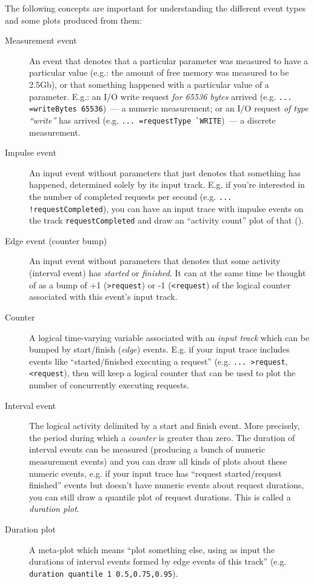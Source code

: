 \documentclass{article}
\begin{document}
The following concepts are important for understanding the different event types and some plots produced from them:
\begin{description}
\item[Measurement event] An event that denotes that a particular parameter was measured to have a particular value (e.g.: the amount of free memory was measured to be 2.5Gb), or that something happened with a particular value of a parameter. E.g.: an I/O write request \emph{for 65536 bytes} arrived (e.g. \verb|... =writeBytes 65536|)~--- a numeric measurement; or an I/O request \emph{of type ``write''} has arrived (e.g. \verb|... =requestType `WRITE|)~--- a discrete measurement.
\item[Impulse event] An input event without parameters that just denotes that something has happened, determined solely by its input track. E.g. if you're interested in the number of completed requests per second (e.g. \verb|... !requestCompleted|), you can have an input trace with impulse events on the track \verb|requestCompleted| and draw an ``activity count'' plot of that ().
\item[Edge event (counter bump)] An input event without parameters that denotes that some activity (interval event) has \emph{started} or \emph{finished}. It can at the same time be thought of as a bump of +1 (\verb|>request|) or -1 (\verb|<request|) of the logical counter associated with this event's input track.
\item[Counter] A logical time-varying variable associated with an \emph{input track} which can be bumped by start/finish (\emph{edge}) events. E.g. if your input trace includes events like ``started/finished executing a request'' (e.g. \verb|... >request|, \verb|<request|), then \timeplot{} will keep a logical counter that can be used to plot the number of concurrently executing requests.
\item[Interval event] The logical activity delimited by a start and finish event. More precisely, the period during which a \emph{counter} is greater than zero. The duration of interval events can be measured (producing a bunch of numeric measurement events) and you can draw all kinds of plots about these numeric events, e.g. if your input trace has ``request started/request finished'' events but doesn't have numeric events about request durations, you can still draw a quantile plot of request durations. This is called a \emph{duration plot}.
\item[Duration plot] A meta-plot which means ``plot something else, using as input the durations of interval events formed by edge events of this track'' (e.g. \verb|duration quantile 1 0.5,0.75,0.95|).
\end{description}
\end{document}
